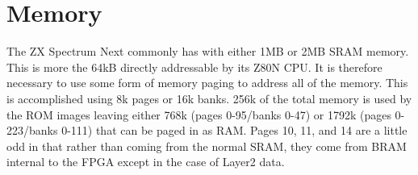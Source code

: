 \chapter{Memory}
\begin{multicols}{2}
The ZX Spectrum Next commonly has with either 1MB or 2MB SRAM
memory. This is more the 64kB directly addressable by its Z80N CPU. It
is therefore necessary to use some form of memory paging to address
all of the memory. This is accomplished using 8k pages or 16k
banks. 256k of the total memory is used by the ROM images leaving
either 768k (pages 0-95/banks 0-47) or 1792k (pages 0-223/banks 0-111)
that can be paged in as RAM. Pages 10, 11, and 14 are a little odd in
that rather than coming from the normal SRAM, they come from BRAM
internal to the FPGA except in the case of Layer2 data.



\end{multicols}
